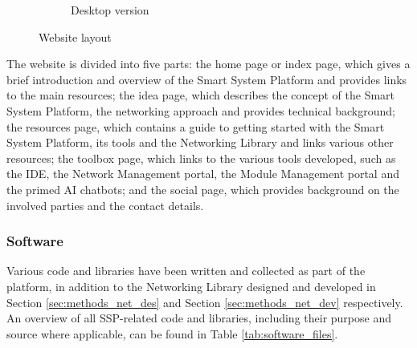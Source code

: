 \begin{figure}[H]
\begin{subfigure}{.81\textwidth}
        \caption{Desktop version}
    \end{subfigure}
    \vspace{\ftspace}
    \caption{Website layout}
    \label{fig:website_layout}
\end{figure}

The website is divided into five parts: the home page or index page, which gives a brief introduction and overview of the Smart System Platform and provides links to the main resources; the idea page, which describes the concept of the Smart System Platform, the networking approach and provides technical background; the resources page, which contains a guide to getting started with the Smart System Platform, its tools and the Networking Library and links various other resources; the toolbox page, which links to the various tools developed, such as the IDE, the Network Management portal, the Module Management portal and the primed AI chatbots; and the social page, which provides background on the involved parties and the contact details. %


\subsubsection{\label{sec:methods_sw}Software}

Various code and libraries have been written and collected as part of the platform, in addition to the Networking Library designed and developed in Section \ref{sec:methods_net_des} and Section \ref{sec:methods_net_dev} respectively. An overview of all SSP-related code and libraries, including their purpose and source where applicable, can be found in Table \ref{tab:software_files}.


